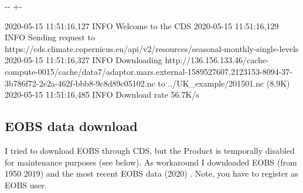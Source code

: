 \documentclass[letterpaper,10pt,english]{sphinxmanual}
\newlength\nbsphinxcodecellspacing
\begin{document}
{
\begin{sphinxVerbatim}[commandchars=\\\{\}]
\llap{\color{nbsphinxin}[97]:\,\hspace{\fboxrule}\hspace{\fboxsep}}

  
  
  
       
                      


\end{sphinxVerbatim}
}

{

\kern-\sphinxverbatimsmallskipamount\kern-\baselineskip
\kern+\FrameHeightAdjust\kern-\fboxrule
\vspace{\nbsphinxcodecellspacing}

\begin{sphinxVerbatim}[commandchars=\\\{\}]
2020-05-15 11:51:16,127 INFO Welcome to the CDS
2020-05-15 11:51:16,129 INFO Sending request to https://cds.climate.copernicus.eu/api/v2/resources/seasonal-monthly-single-levels
2020-05-15 11:51:16,327 INFO Downloading http://136.156.133.46/cache-compute-0015/cache/data7/adaptor.mars.external-1589527607.2123153-8094-37-3b786f72-2e2a-462f-bbb8-9c8d89c05102.nc to ../UK\_example/201501.nc (8.9K)
2020-05-15 11:51:16,485 INFO Download rate 56.7K/s
\end{sphinxVerbatim}
}


\subsection{EOBS data download}
\label{\detokenize{Notebooks/1.Download/1.Retrieve:EOBS-data-download}}
I tried to download EOBS through CDS, but the Product is temporally disabled for maintenance purposes (see below). As workaround I downloaded EOBS (from 1950 \sphinxhyphen{} 2019) and the most recent EOBS data (2020) . Note, you have to register as E\sphinxhyphen{}OBS user.
\end{document}
